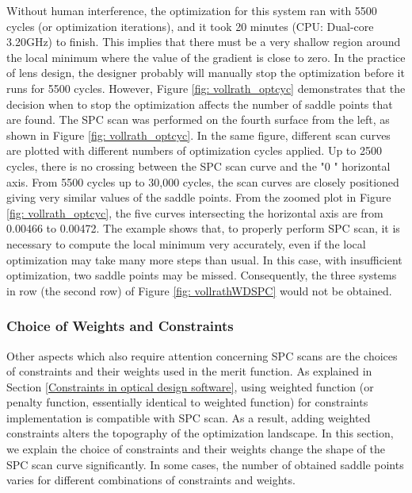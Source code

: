 Without human interference, the optimization for this system ran with 5500 cycles (or optimization iterations), and it took 20 minutes (CPU: Dual-core 3.20GHz) to finish. This implies that there must be a very shallow region around the local minimum where the value of the gradient is close to zero. In the practice of lens design, the designer probably will manually stop the optimization before it runs for 5500 cycles. However, Figure \ref{fig: vollrath_optcyc} demonstrates that the decision when to stop the optimization affects the number of saddle points that are found. The SPC scan was performed on the fourth surface from the left, as shown in Figure \ref{fig: vollrath_optcyc}. In the same figure, different scan curves are plotted with different numbers of optimization cycles applied. Up to 2500 cycles, there is no crossing between the SPC scan curve and the "$0$ " horizontal axis. From 5500 cycles up to 30,000 cycles, the scan curves are closely positioned giving very similar values of the saddle points. From the zoomed plot in Figure \ref{fig: vollrath_optcyc}, the five curves intersecting the horizontal axis are from 0.00466 to 0.00472. The example shows that, to properly perform SPC scan, it is necessary to compute the local minimum very accurately, even if the local optimization may take many more steps than usual. In this case, with insufficient optimization, two saddle points may be missed. Consequently, the three systems in row  (the second row) of Figure \ref{fig: vollrathWDSPC} would not be obtained. 

\subsubsection{Choice of Weights and Constraints}
Other aspects which also require attention concerning SPC scans are the choices of constraints and their weights used in the merit function. As explained in Section \ref{Constraints in optical design software}, using weighted function (or penalty function, essentially identical to weighted function) for constraints implementation is compatible with SPC scan. As a result, adding weighted constraints alters the topography of the optimization landscape.  In this section, we explain the choice of constraints and their weights change the shape of the SPC scan curve significantly. In some cases, the number of obtained saddle points varies for different combinations of constraints and weights. 

